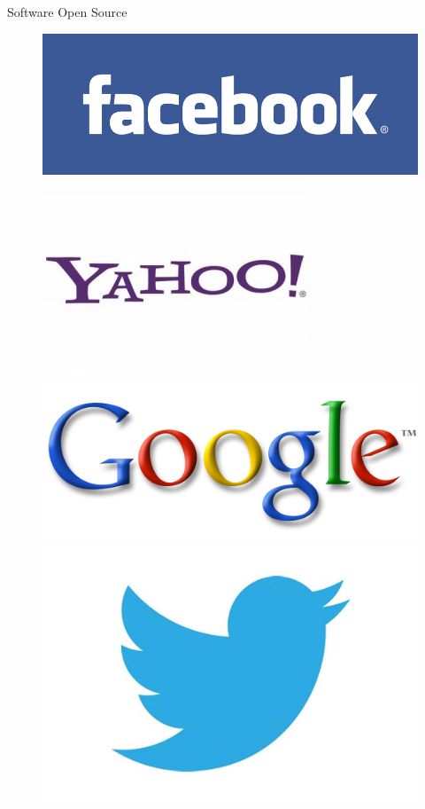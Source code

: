   \begin{frame}{Software Open Source}

   \begin{figure}[hb]
     \centering
     \includegraphics[scale=0.3]{facebook-logo.jpg}
     \includegraphics[scale=0.2]{yahoo-logo-300x224.jpg}
     \includegraphics[scale=1]{google-logo.jpg}
     \includegraphics[scale=0.06]{new-twitter-logo.jpg}

\end{figure}
\end{frame}
